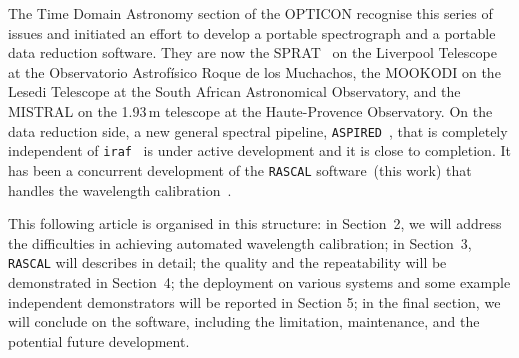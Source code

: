 \documentclass[fleqn,usenatbib]{rasti}
\begin{document}
The Time Domain Astronomy section of the OPTICON recognise this series of issues and
initiated an effort to develop a portable spectrograph and a portable data reduction
software. They are now the SPRAT~\citep{2014SPIE.9147E..8HP} on the Liverpool
Telescope~\citep{2004SPIE.5489..679S} at the Observatorio Astrof{\'i}sico Roque de los
Muchachos, the MOOKODI on the Lesedi Telescope 
at the South African Astronomical Observatory, and the MISTRAL on the 1.93\,m
telescope at the Haute-Provence Observatory. On the data reduction side, a new
general spectral pipeline, \texttt{ASPIRED}~\citep{2020arXiv201203505L, 2020zndo...4306065L},
that is completely independent of \texttt{iraf}~\citep{1986SPIE..627..733T} is under
active development and it is close to completion. It has been a concurrent development
of the \texttt{RASCAL} software~(this work) that handles the wavelength
calibration~\citep{2019arXiv191205883V, 2020zndo...4117517V}.

This following article is organised in this structure: in Section~2, we will address
the difficulties in achieving automated wavelength calibration; in Section~3,
\texttt{RASCAL} will describes in detail; the quality and the repeatability will
be demonstrated in Section~4; the deployment on various systems and some example
independent demonstrators will be reported in Section 5; in the final section, we
will conclude on the software, including the limitation, maintenance, and the potential
future development.
\end{document}
